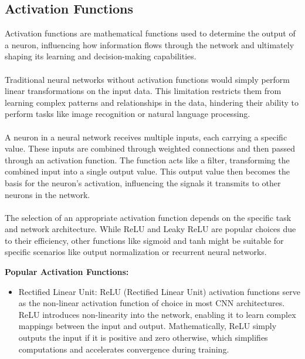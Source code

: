 \documentclass{article}
\begin{document}
\subsection{Activation Functions}
Activation functions are mathematical functions used to determine the output of a neuron, influencing how information flows through the network and ultimately shaping its learning and decision-making capabilities.\\\\
Traditional neural networks without activation functions would simply perform linear transformations on the input data. This limitation restricts them from learning complex patterns and relationships in the data, hindering their ability to perform tasks like image recognition or natural language processing.\\\\
A neuron in a neural network receives multiple inputs, each carrying a specific value. These inputs are combined through weighted connections and then passed through an activation function. The function acts like a filter, transforming the combined input into a single output value. This output value then becomes the basis for the neuron's activation, influencing the signals it transmits to other neurons in the network.\\\\
The selection of an appropriate activation function depends on the specific task and network architecture. While ReLU and Leaky ReLU are popular choices due to their efficiency, other functions like sigmoid and tanh might be suitable for specific scenarios like output normalization or recurrent neural networks.\newline

\textbf{Popular Activation Functions:}\hfill\newline\\

\begin{itemize}
    \item[\ding{118}] Rectified Linear Unit:
          ReLU (Rectified Linear Unit) activation functions serve as the non-linear activation function of choice in most CNN architectures. ReLU introduces non-linearity into the network, enabling it to learn complex mappings between the input and output. Mathematically, ReLU simply outputs the input if it is positive and zero otherwise, which simplifies computations and accelerates convergence during training.
\end{itemize}
\end{document}
